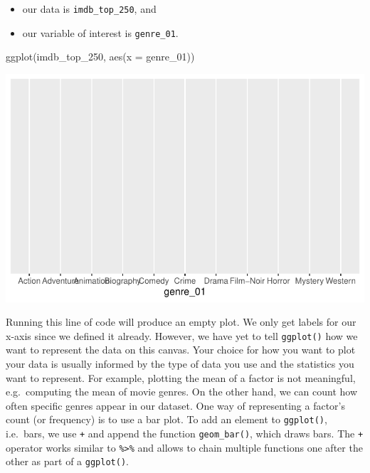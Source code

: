 \documentclass[
  letterpaper,
]{krantz}
\makeatletter
\newenvironment{Shaded}{\begin{snugshade}}{\end{snugshade}}
\newcommand{\AttributeTok}[1]{\textcolor[rgb]{0.40,0.45,0.13}{#1}}
\newcommand{\FunctionTok}[1]{\textcolor[rgb]{0.28,0.35,0.67}{#1}}
\newcommand{\NormalTok}[1]{\textcolor[rgb]{0.00,0.23,0.31}{#1}}
\newenvironment{kframe}{%
\medskip{}
\setlength{\fboxsep}{.8em}
 \def\at@end@of@kframe{}%
 \ifinner\ifhmode%
  \def\at@end@of@kframe{\end{minipage}}%
  \begin{minipage}{\columnwidth}%
 \fi\fi%
 \def\FrameCommand##1{\hskip\@totalleftmargin \hskip-\fboxsep
 \colorbox{shadecolor}{##1}\hskip-\fboxsep
     \hskip-\linewidth \hskip-\@totalleftmargin \hskip\columnwidth}%
 \MakeFramed {\advance\hsize-\width
   \@totalleftmargin\z@ \linewidth\hsize
   \@setminipage}}%
 {\par\unskip\endMakeFramed%
 \at@end@of@kframe}
\renewenvironment{Shaded}{\begin{kframe}}{\end{kframe}}
\makeatother
\begin{document}
\begin{itemize}
\item
  our data is \texttt{imdb\_top\_250}, and
\item
  our variable of interest is \texttt{genre\_01}.
\end{itemize}

\begin{Shaded}
\begin{Highlighting}[]
\FunctionTok{ggplot}\NormalTok{(imdb\_top\_250, }\FunctionTok{aes}\NormalTok{(}\AttributeTok{x =}\NormalTok{ genre\_01))}
\end{Highlighting}
\end{Shaded}

\includegraphics{08_descriptive_statistics_files/figure-pdf/most-popular-genre-incomplete-plot-1.pdf}

Running this line of code will produce an empty plot. We only get labels
for our x-axis since we defined it already. However, we have yet to tell
\texttt{ggplot()} how we want to represent the data on this canvas. Your
choice for how you want to plot your data is usually informed by the
type of data you use and the statistics you want to represent. For
example, plotting the mean of a factor is not meaningful, e.g.~computing
the mean of movie genres. On the other hand, we can count how often
specific genres appear in our dataset. One way of representing a
factor's count (or frequency) is to use a bar plot. To add an element to
\texttt{ggplot()}, i.e.~bars, we use \texttt{+} and append the function
\texttt{geom\_bar()}, which draws bars. The \texttt{+} operator works
similar to \texttt{\%\textgreater{}\%} and allows to chain multiple
functions one after the other as part of a \texttt{ggplot()}.
\end{document}
